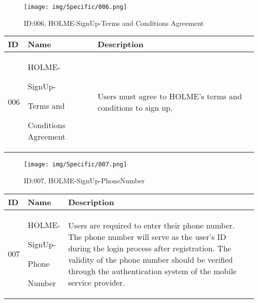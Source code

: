 \documentclass[conference]{IEEEtran}
\begin{document}
\begin{enumerate}
\begin{figure}[h]
\centering
\texttt{[image: img/Specific/006.png]}
\caption{ID:006, HOLME-SignUp-Terms and Conditions Agreement}
\end{figure}
\begin{table}[h]
\def\arraystretch{1.2} \small
    \begin{tabular}{|p{1cm}|p{1.8cm}|p{5.0cm}|}
        \hline
        ID & Name & Description\\ \hline
         006 \par  & HOLME-\par SignUp-\par Terms and \par Conditions Agreement &Users must agree to HOLME's terms and conditions to sign up.\\ \hline
	\end{tabular}
\end{table}


\begin{figure}[h]
\centering
\texttt{[image: img/Specific/007.png]}
\caption{ID:007, HOLME-SignUp-PhoneNumber}
\end{figure}
\begin{table}[h]
\def\arraystretch{1.2} \small
    \begin{tabular}{|p{1cm}|p{1.8cm}|p{5.0cm}|}
        \hline
        ID & Name & Description\\ \hline
         007 \par  & HOLME-\par SignUp-\par Phone \par Number &Users are required to enter their phone number. The phone number will serve as the user's ID during the login process after registration. The validity of the phone number should be verified through the authentication system of the mobile service provider.\\ \hline
	\end{tabular}
\end{table}



\end{enumerate}
\end{document}
